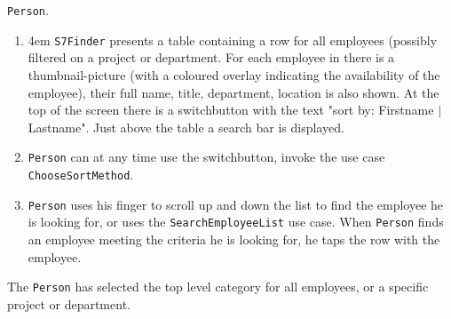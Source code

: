 \usecaseline

\begin{description}[style=multiline,leftmargin=4cm,font=\normalfont]
    \item[\emph{Paticipating actors:}] \texttt{Person}.
\end{description}

\usecaseline

\begin{description}[style=multiline,leftmargin=4cm,font=\normalfont]
    \item[\emph{Flow of events}]
        \begin{enumerate} [style=multiline,leftmargin=1.5em,font=\normalfont]

            \item {\leftskip4em \texttt{S7Finder} presents a table containing a row
              for all employees (possibly filtered on a project or
              department.  For each employee in there is a
              thumbnail-picture (with a coloured overlay indicating
              the availability of the employee), their full name,
              title, department, location is also shown.  At the top
              of the screen there is a switchbutton with the text
              "sort by: Firstname $|$ Lastname".  Just above the table
              a search bar is displayed.

            }

          \item \texttt{Person} can at any time use the switchbutton,
            invoke the use case \texttt{ChooseSortMethod}.

          \item \texttt{Person} uses his finger to scroll up and down
            the list to find the employee he is looking for, or uses
            the \texttt{SearchEmployeeList} use case. When
            \texttt{Person} finds an employee meeting the criteria he
            is looking for, he taps the row with the employee.

        
        \end{enumerate}

\end{description}

\usecaseline

\begin{description}[style=multiline,leftmargin=4cm,font=\normalfont]
\item[\emph{Entry condition}] The \texttt{Person} has selected the top
  level category for all employees, or a specific project or
  department.
\end{description}

